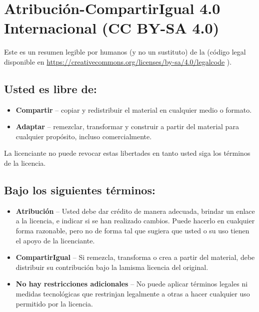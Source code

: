 \chapter*{Atribución-CompartirIgual 4.0 Internacional (CC BY-SA 4.0)}

Este es un resumen legible por humanos (y no un sustituto) de la
(código legal disponible en
\url{https://creativecommons.org/licenses/by-sa/4.0/legalcode}
).

\section*{Usted es libre de:}

\begin{itemize}

\item \textbf{Compartir} --
copiar y redistribuir el material en cualquier medio o formato.

\item \textbf{Adaptar} -- 
remezclar, transformar y construir a partir del material
para cualquier propósito, incluso comercialmente.

\end{itemize}

La licenciante no puede revocar estas libertades en tanto usted siga los
términos de la licencia.

\section*{Bajo los siguientes términos:}

\begin{itemize}

\item \ccAttribution \quad \textbf{Atribución} --
Usted debe dar crédito de manera adecuada, brindar un enlace a la licencia, e
indicar si se han realizado cambios. Puede hacerlo en cualquier forma
razonable, pero no de forma tal que sugiera que usted o su uso tienen el apoyo
de la licenciante. 

\item \ccShareAlike \quad \textbf{CompartirIgual} --
Si remezcla, transforma o crea a partir del material, debe distribuir su
contribución bajo la lamisma licencia del original. 

\item \textbf{No hay restricciones adicionales} -- 
No puede aplicar términos legales ni medidas tecnológicas que restrinjan
legalmente a otras a hacer cualquier uso permitido por la licencia. 

\end{itemize}

